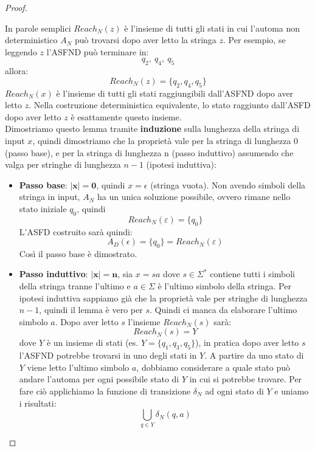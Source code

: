 \begin{proof}
{{\begin{lemma}
\end{lemma}}}
In parole semplici \(Reach_N(z)\) è l’insieme di tutti gli stati in cui l’automa non deterministico \(A_N\) può trovarsi dopo aver letto la stringa \(z\).
Per esempio, se leggendo \(z\) l’ASFND può terminare in:
\[
q_2,\ q_4,\ q_5
\]allora:
\[
Reach_N(z)=\{q_2,q_4,q_5\}
\]
\(Reach_N(x)\) è l’insieme di tutti gli stati raggiungibili dall’ASFND dopo aver letto \(z\). Nella costruzione 
deterministica equivalente, lo stato raggiunto dall’ASFD dopo aver letto \(z\) è esattamente questo insieme.\smallskip\\
Dimostriamo questo lemma tramite \textbf{induzione} sulla lunghezza della stringa di
input $x$, quindi dimostriamo che la proprietà vale per la stringa di lunghezza 0 (passo base),
e per la stringa di lunghezza n (passo induttivo) assumendo che valga per stringhe di lunghezza $n-1$ (ipotesi induttiva):
\begin{itemize}[label=--]
    \item \textbf{Passo base}: $\bm{|x| = 0}$, quindi $x = \epsilon$ (stringa vuota). Non avendo simboli della stringa
    in input, $A_N$ ha un unica soluzione possibile, ovvero rimane nello stato iniziale $q_0$, quindi
    \[  Reach_N(\varepsilon)=\{q_0\}   \]
    L'ASFD costruito sarà quindi: 
    \[A_D(\epsilon) = \{ q_0  \} = Reach_N(\varepsilon)\]
    Così il passo base è dimostrato.

    \item \textbf{Passo induttivo}: $\bm{|x|= n}$, sia $x = sa$ dove $s\in \Sigma^*$ contiene tutti i simboli della stringa
    tranne l'ultimo e $a\in \Sigma$ è l'ultimo simbolo della stringa. Per ipotesi induttiva sappiamo già che la proprietà 
    vale per stringhe di lunghezza $n-1$, quindi il lemma è vero per $s$. Quindi ci manca da elaborare l'ultimo
    simbolo $a$. Dopo aver letto $s$ l'insieme $Reach_N (s)$ sarà:
    \[  Reach_N (s) = Y \]
    dove $Y$ è un insieme di stati (es. $Y=\{q_1,q_3,q_5\}  $), in pratica dopo aver letto $s$ l'ASFND potrebbe trovarsi in uno 
    degli stati in $Y$. A partire da uno stato di $Y$ viene letto l'ultimo simbolo $a$, dobbiamo considerare a quale stato può andare l'automa 
    per ogni possibile stato di $Y$ in cui si potrebbe trovare. Per fare ciò applichiamo la funzione di transizione $\delta_N$ ad ogni stato di $Y$ e uniamo 
    i risultati:
    \[ \bigcup_{q \in Y} \delta_N(q,a)   \]
    

\end{itemize}
\end{proof}
